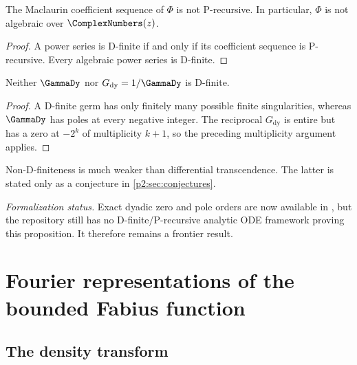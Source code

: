 \documentclass[11pt]{article}
\theoremstyle{definition}
\theoremstyle{remark}
\begin{document}
\begin{corollary}
The Maclaurin coefficient sequence of $\Phi$ is not P-recursive.  In particular, $\Phi$ is
not algebraic over $\ComplexNumbers(z)$.
\end{corollary}

\begin{proof}
A power series is D-finite if and only if its coefficient sequence is P-recursive.  Every
algebraic power series is D-finite.
\end{proof}

\begin{proposition}
Neither $\GammaDy$ nor $G_{\mathrm{dy}}=1/\GammaDy$ is D-finite.
\end{proposition}

\begin{proof}
A D-finite germ has only finitely many possible finite singularities, whereas $\GammaDy$ has
poles at every negative integer.  The reciprocal $G_{\mathrm{dy}}$ is entire but has a zero
at $-2^k$ of multiplicity $k+1$, so the preceding multiplicity argument applies.
\end{proof}

\begin{remark}
Non-D-finiteness is much weaker than differential transcendence.  The latter is stated only
as a conjecture in \cref{p2:sec:conjectures}.
\end{remark}

\emph{Formalization status.}  Exact dyadic zero and pole orders are now available in
, but the repository still has no D-finite/P-recursive analytic
ODE framework proving this proposition.  It therefore remains a frontier result.

\section{Fourier representations of the bounded Fabius function}
\label{p2:sec:F-Fourier}

\subsection{The density transform}
\end{document}
